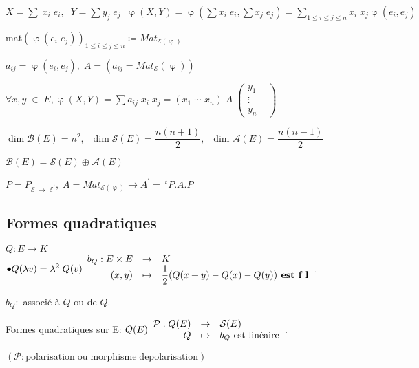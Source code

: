 \documentclass[11pt]{article} %
\begin{document}
 $X= \sum \; x_i\; e_i, \; \; Y= \sum y_j \; e_j \; \; \upvarphi(X,Y)= \upvarphi(\sum x_i \; e_i, \sum x_j \; e_j) = \sum_{1 \leq i \leq j \leq n} x_i \; x_j \upvarphi (e_i,e_j)$

 mat$ (\upvarphi(e_i \; e_j))_{1 \leq i \leq j \leq n} \coloneqq Mat_{\mathcal{E}(\upvarphi)}$

 $a_{ij}= \upvarphi(e_i, e_j), \; A=(a_{ij}=Mat_{\mathcal{E}}(\upvarphi))$

 $ \forall x,y \; \in \; E, \upvarphi(X,Y)= \sum a_{ij} \; x_i \; x_j = ( x_1 \; \cdots \; x_n ) \; A \; \begin{pmatrix}
y_{1} & \\
\vdots & \\
y_{n} &
\end{pmatrix}$

\proposition $\dim \mathcal{B}(E)=n^2 , \; \; \dim \mathcal{S}(E)= \dfrac{n(n+1)}{2} , \; \; \dim \mathcal{A}(E)= \dfrac{n(n-1)}{2}$

\proposition $\mathcal{B}(E)= \mathcal{S}(E) \oplus \mathcal{A}(E)$

\proposition $P= P_{\mathcal{E} \; \to \; \mathcal{E}^{'}} , \; A = Mat_{\mathcal{E} (\upvarphi )} \longrightarrow A^{'}= ~^t{P}.A.P$

\subsection{Formes quadratiques}

 $Q:E \to K \; $  \\ $\bullet Q(\lambda v) = \lambda^{2} \; Q(v) \\  \begin{array}{rcl}
b_Q: E \times E &\to& K\\
(x,y) &\mapsto & \dfrac{1}{2}(Q(x+y)-Q(x)-Q(y)) \textbf{ est f l}
\end{array} $.

 $b_Q : $ associé à $Q$ ou de $Q$.

\proposition Formes quadratiques sur E: $Q(E)  \\  \begin{array}{rcl}
\mathcal{P}: Q(E)&\to& \mathcal{S}(E)\\
Q &\mapsto & b_Q \text{ est linéaire}
\end{array} \\ $.

 $( \mathcal{P}: \text{polarisation} \; \text{ou} \; \text{morphisme} \; \text{de} \text{polarisation} )$
\end{document}
